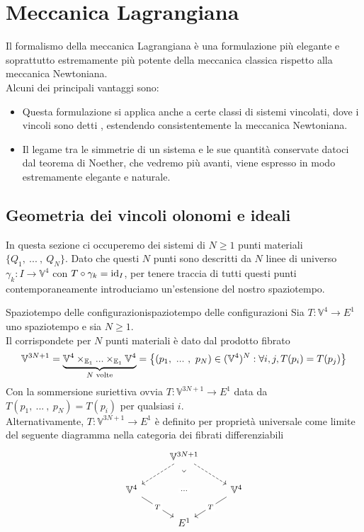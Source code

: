 \documentclass[openany]{book}
\renewcommand\V{\mathbb{V}}
\begin{document}
\chapter{Meccanica Lagrangiana}

Il formalismo della meccanica Lagrangiana è una formulazione più elegante e soprattutto estremamente più potente della meccanica classica rispetto alla meccanica Newtoniana.\\
Alcuni dei principali vantaggi sono:\begin{itemize}
    \item Questa formulazione si applica anche a certe classi di sistemi vincolati, dove i vincoli sono detti , estendendo consistentemente la meccanica Newtoniana.
    \item Il legame tra le simmetrie di un sistema e le sue quantità conservate datoci dal teorema di Noether, che vedremo più avanti, viene espresso in modo estremamente elegante e naturale.
\end{itemize}

\section{Geometria dei vincoli olonomi e ideali}

In questa sezione ci occuperemo dei sistemi di $N\ge 1$ punti materiali $\{Q_1,\ ...\ ,\ Q_N\}$. Dato che questi $N$ punti sono descritti da $N$ linee di universo $\gamma_k : I \to \V^4$ con $T\circ \gamma_k = \operatorname{id}_{I}$, per tenere traccia di tutti questi punti contemporaneamente introduciamo un'estensione del nostro spaziotempo.

\begin{definition}{Spaziotempo delle configurazioni}{spaziotempo delle configurazioni}
    Sia $T:\V^4\to E^1$ uno spaziotempo e sia $N\ge 1$.\\
    Il corrispondete  per $N$ punti materiali è dato dal prodotto fibrato 
    \[ \V^{3N+1} = \underbrace{\V^4 \times_{\E_1}...\times_{\E_1} \V^4 }_{N\text{ volte}} = \left\{ (p_1,\ ...\ ,\ p_N) \in (\V^4)^N : \forall i, j, T(p_i) = T(p_j) \right\} \]
    Con la sommersione suriettiva ovvia $T:\V^{3N+1}\to E^1$ data da $T(p_1,\ ...\ ,\ p_N) = T(p_i)$ per qualsiasi $i$.\\
    Alternativamente, $T:\V^{3N+1}\to E^1$ è definito per proprietà universale come limite del seguente diagramma nella categoria dei fibrati differenziabili 
    \[\begin{tikzcd}
    	& {\V^{3N+1}} & \\
    	{\V^4} && {\V^4} \\
	    & {E^1}
    	\arrow[dashed, from=1-2, to=2-1]
	    \arrow[dashed, from=1-2, to=2-3]
    	\arrow["\lrcorner"{anchor=center, pos=0.125, rotate=-45}, draw=none, from=1-2, to=3-2]
	    \arrow["{...}"{description}, draw=none, from=2-1, to=2-3]
    	\arrow["T"{description}, from=2-1, to=3-2]
	    \arrow["T"{description}, from=2-3, to=3-2]
    \end{tikzcd}\]
\end{definition}
\end{document}
